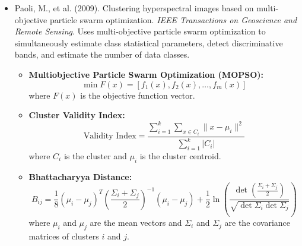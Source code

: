 \documentclass[10pt,svgnames,fragile]{beamer}
\begin{document}
\begin{frame}{}
\tiny
\begin{itemize}

\item Paoli, M., et al. (2009). Clustering hyperspectral images based on multi-objective particle swarm optimization. \textit{IEEE Transactions on Geoscience and Remote Sensing}. \href{https://consensus.app/papers/clustering-hyperspectral-images-based-multiobjective-paoli/76e19f51eed85904a08c9b811f014d8f/?utm_source=chatgpt}{\color{blue}{DOI: 10.1109/TGRS.2009.2025099}}
{\color{gray}Uses multi-objective particle swarm optimization to simultaneously estimate class statistical parameters, detect discriminative bands, and estimate the number of data classes.}
\begin{itemize} \tiny
    \item \textbf{Multiobjective Particle Swarm Optimization (MOPSO):}
    \[
    \min F(x) = [f_1(x), f_2(x), \ldots, f_m(x)]
    \]
    where \( F(x) \) is the objective function vector.
    \item \textbf{Cluster Validity Index:}
    \[
    \text{Validity Index} = \frac{\sum_{i=1}^{k} \sum_{x \in C_i} \|x - \mu_i\|^2}{\sum_{i=1}^{k} |C_i|}
    \]
    where \( C_i \) is the cluster and \( \mu_i \) is the cluster centroid.
    \item \textbf{Bhattacharyya Distance:}
    \[
    B_{ij} = \frac{1}{8} (\mu_i - \mu_j)^T \left(\frac{\Sigma_i + \Sigma_j}{2}\right)^{-1} (\mu_i - \mu_j) + \frac{1}{2} \ln \left(\frac{\det\left(\frac{\Sigma_i + \Sigma_j}{2}\right)}{\sqrt{\det \Sigma_i \det \Sigma_j}}\right)
    \]
    where \( \mu_i \) and \( \mu_j \) are the mean vectors and \( \Sigma_i \) and \( \Sigma_j \) are the covariance matrices of clusters \( i \) and \( j \).
\end{itemize}

\end{itemize}
\end{frame}
\end{document}
